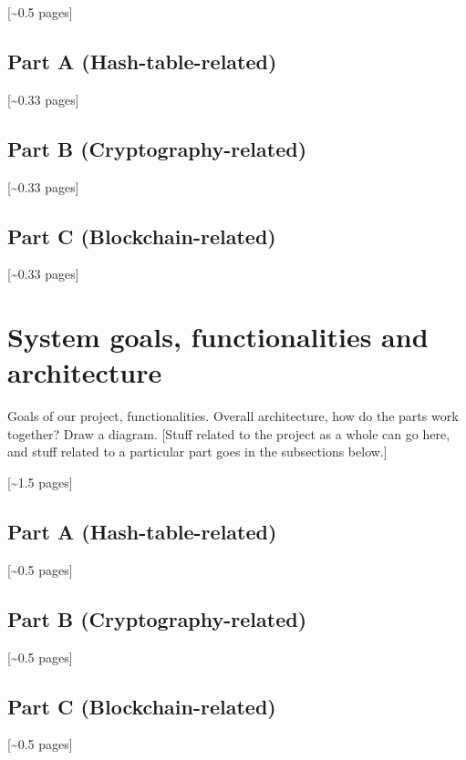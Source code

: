 \documentclass[12pt,a4paper,draft]{article}
\begin{document}
[\textasciitilde{}0.5 pages]

\subsection{Part A (Hash-table-related)}

[\textasciitilde{}0.33 pages]

\subsection{Part B (Cryptography-related)}

[\textasciitilde{}0.33 pages]

\subsection{Part C (Blockchain-related)}

[\textasciitilde{}0.33 pages]

\section{System goals, functionalities and architecture}

Goals of our project, functionalities.
Overall architecture, how do the parts work together?
Draw a diagram.
[Stuff related to the project as a whole can go here, and stuff related to a particular part goes in the subsections below.]

[\textasciitilde{}1.5 pages]

\subsection{Part A (Hash-table-related)}

[\textasciitilde{}0.5 pages]

\subsection{Part B (Cryptography-related)}

[\textasciitilde{}0.5 pages]

\subsection{Part C (Blockchain-related)}

[\textasciitilde{}0.5 pages]
\end{document}
